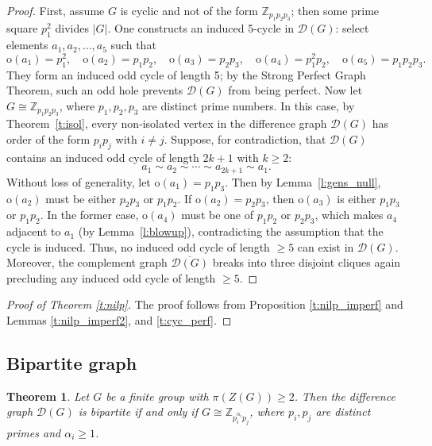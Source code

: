 \documentclass[12pt]{amsart}
\theoremstyle{plain}
\newtheorem{theorem}{Theorem}[section]
\theoremstyle{remark}
\theoremstyle{definition}
\begin{document}
\begin{proof}
First, assume \(G\) is cyclic and not of the form \(\mathbb{Z}_{p_1 p_2 p_3}\); then some prime square \(p_1^2\) divides \(\lvert G\rvert\). One constructs an induced 5-cycle in \(\mathcal{D}(G)\): select elements \(a_1, a_2, \dots, a_5\) such that
\[
\mathrm{o}(a_1) = p_1^2,\quad
\mathrm{o}(a_2) = p_1 p_2,\quad
\mathrm{o}(a_3) = p_2 p_3,\quad
\mathrm{o}(a_4) = p_1^2 p_2,\quad
\mathrm{o}(a_5) = p_1 p_2 p_3.
\]
They form an induced odd cycle of length 5; by the Strong Perfect Graph Theorem, such an odd hole prevents \(\mathcal{D}(G)\) from being perfect.
Now let \(G \cong \mathbb{Z}_{p_1 p_2 p_3}\), where \(p_1, p_2, p_3\) are distinct prime numbers. In this case, by Theorem~\ref{t:isol}, every non‑isolated vertex in the difference graph \(\mathcal{D}(G)\) has order of the form \(p_i p_j\) with \(i \ne j\).
Suppose, for contradiction, that \(\mathcal{D}(G)\) contains an induced odd cycle of length \(2k + 1\) with \(k \ge 2\):
\[
a_1 \sim a_2 \sim \cdots \sim a_{2k+1} \sim a_1.
\]
Without loss of generality, let \(\mathrm{o}(a_1) = p_1 p_3\). Then by Lemma~\ref{l:gens_null}, \(\mathrm{o}(a_2)\) must be either \(p_2 p_3\) or \(p_1 p_2\). 
If \(\mathrm{o}(a_2) = p_2 p_3\), then \(\mathrm{o}(a_3)\) is either \(p_1 p_3\) or \(p_1 p_2\).  
In the former case, \(\mathrm{o}(a_4)\) must be one of \(p_1 p_2\) or \(p_2 p_3\), which makes \(a_4\) adjacent to \(a_1\) (by Lemma~\ref{l:blowup}), contradicting the assumption that the cycle is induced.
Thus, no induced odd cycle of length $\geq5$ can exist in \(\mathcal{D}(G)\).
Moreover, the complement graph \(\overline{\mathcal{D}(G)}\) breaks into three disjoint cliques again precluding any induced odd cycle of length $\geq 5.$
 

\end{proof}

\begin{proof}[Proof of Theorem \ref{t:nilp}]
The proof follows from Proposition \ref{t:nilp_imperf} and Lemmas \ref{t:nilp_imperf2}, and \ref{t:cyc_perf}.    
\end{proof}

\subsection{Bipartite graph} 
\begin{theorem}\label{t:bip}
Let \(G\) be a finite group with \(\pi(Z(G))\ge 2\). Then the difference graph \(\mathcal{D}(G)\) is bipartite if and only if 
\(G \cong \mathbb{Z}_{p_i^{\alpha_i} p_j}\), where \(p_i, p_j\) are distinct primes and \(\alpha_i \ge 1\).

\end{theorem}
\end{document}
